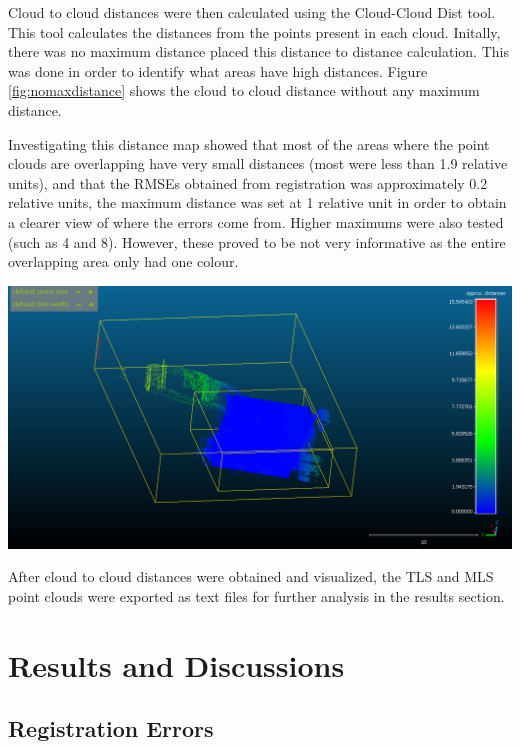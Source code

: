 \documentclass[man]{apa7}
\begin{document}
Cloud to cloud distances were then calculated using the Cloud-Cloud Dist tool. This tool calculates the distances from the points present in each cloud. Initally, there was no maximum distance placed this distance to distance calculation. This was done in order to identify what areas have high distances. Figure \ref{fig:nomaxdistance} shows the cloud to cloud distance without any maximum distance. 


Investigating this distance map showed that most of the areas where the point clouds are overlapping have very small distances (most were less than 1.9 relative units), and that the RMSEs obtained from registration was approximately 0.2 relative units, the maximum distance was set at 1 relative unit in order to obtain a clearer view of where the errors come from. Higher maximums were also tested (such as 4 and 8). However, these proved to be not very informative as the entire overlapping area only had one colour.

\begin{minipage}{\linewidth}
  \includegraphics[height=\textheight/2 ,width=\textwidth/1]{figures/noMaxDistance.png}
  \label{fig:nomaxdistance}
\end{minipage}

After cloud to cloud distances were obtained and visualized, the TLS and MLS point clouds were exported as text files for further analysis in the results section. 
\newpage
\section{Results and Discussions}

\subsection{Registration Errors}
\end{document}
